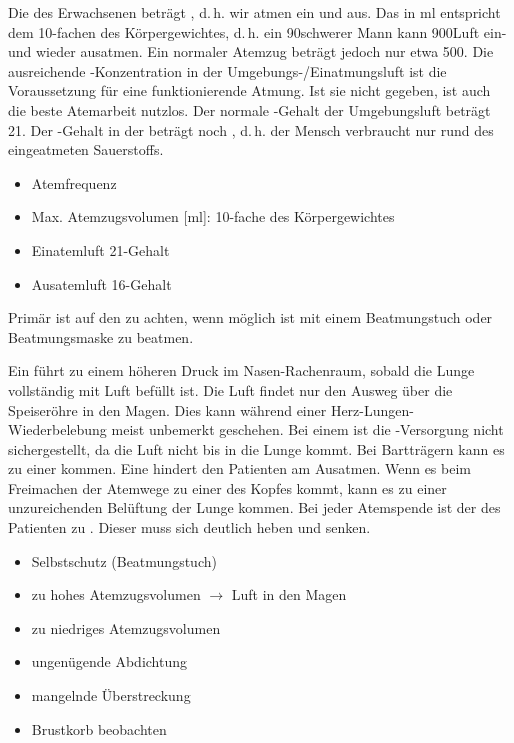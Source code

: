 {
Die  des Erwachsenen beträgt
\PerMin*, d.\,h. wir atmen
\PerMin* ein und aus. 
Das
 in ml
entspricht dem 10-fachen des Körpergewichtes, d.\,h. ein 90\Kg*
schwerer Mann kann 900\Ml* Luft ein- und wieder ausatmen.
Ein normaler Atemzug beträgt jedoch nur etwa 500\Ml*.
Die ausreichende -Konzentration in der Umgebungs-/Einatmungsluft ist die
Voraussetzung für eine funktionierende Atmung. Ist sie
nicht gegeben, ist auch die beste Atemarbeit nutzlos. Der
normale -Gehalt der Umgebungsluft beträgt
21\PC*. Der -Gehalt in der  beträgt
noch \PC*, d.\,h. der Mensch verbraucht  
nur rund  des
eingeatmeten Sauerstoffs. \cite{Silbernagl3-Atmung}
}{
\begin{itemize}
  \item Atemfrequenz \PerMin*
  \item Max. Atemzugsvolumen [ml]: 10-fache des Körpergewichtes
  \item Einatemluft 21\PC* {}-Gehalt
  \item Ausatemluft 16\PC* {}-Gehalt
\end{itemize}
}{}{}{}

{
Primär ist auf den  zu achten, wenn möglich
ist mit einem Beatmungstuch oder Beatmungsmaske zu beatmen.

Ein  führt zu einem höheren
Druck im Nasen-Rachenraum, sobald die Lunge vollständig mit
Luft befüllt ist. Die Luft findet nur den Ausweg über die
Speiseröhre in den Magen. Dies kann während einer
Herz-Lungen-Wiederbelebung meist unbemerkt geschehen. Bei
einem  ist die
-Versorgung nicht sichergestellt, da die Luft nicht
bis in die Lunge kommt. Bei Bartträgern kann es zu einer
 kommen. Eine  hindert den Patienten am Ausatmen. Wenn es
beim Freimachen der Atemwege zu einer  des Kopfes kommt, kann es zu einer
unzureichenden Belüftung der Lunge kommen. Bei jeder
Atemspende ist der  des Patienten zu
. Dieser muss sich deutlich heben und senken.

}{
\begin{itemize}
  \item Selbstschutz (Beatmungstuch)
  \item zu hohes Atemzugsvolumen ${\rightarrow}$ Luft in den Magen
  \item zu niedriges Atemzugsvolumen 
  \item ungenügende Abdichtung
  \item mangelnde Überstreckung
  \item Brustkorb beobachten 
\end{itemize}
}{}{}{}

